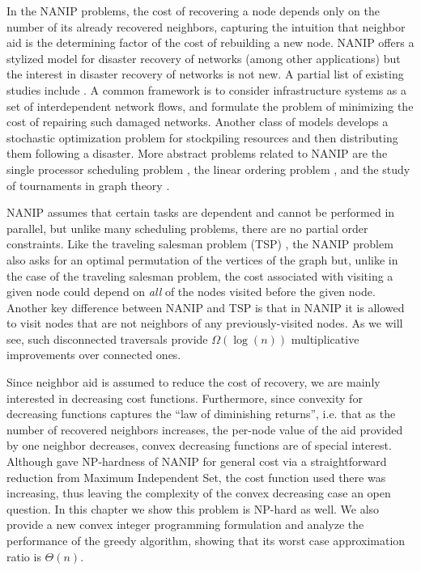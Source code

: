 In the NANIP problems, the cost of recovering a node depends only on the
number of its already recovered neighbors, capturing the intuition that
neighbor aid is the determining factor of the cost of rebuilding a new node.
NANIP offers a stylized model for disaster recovery of networks (among other
applications) but the interest in disaster recovery of networks is not new.  A
partial list of existing studies include
\cite{Guha99,nurre2010restoring,Lee07,Adibi94,Bertoli02,coffrin2011strategic}.
A common framework is to consider infrastructure systems as a set of
interdependent network flows, and formulate the problem of minimizing the cost
of repairing such damaged networks.  Another class of models
\cite{Hentenryck10} develops a stochastic optimization problem for stockpiling
resources and then distributing them following a disaster.  More abstract
problems related to NANIP are the single processor scheduling problem
\cite{Karp61}, the linear ordering problem \cite{Mitchell96}, and the study of
tournaments in graph theory \cite{West01}.  

NANIP assumes that certain tasks are dependent and cannot be performed in
parallel, but unlike many scheduling problems, there are no partial order
constraints. Like the traveling salesman problem (TSP)
\cite{schrijver2005history}, the NANIP problem also asks for an optimal
permutation of the vertices of the graph but, unlike in the case of the
traveling salesman problem, the cost associated with visiting a given node
could depend on \emph{all} of the nodes visited before the given node. Another
key difference between NANIP and TSP is that in NANIP it is allowed to visit
nodes that are not neighbors of any previously-visited nodes. As we will see,
such disconnected traversals provide $\Omega(\log(n))$ multiplicative
improvements over connected ones.

Since neighbor aid is assumed to reduce the cost of recovery, we are mainly
interested in decreasing cost functions. Furthermore, since convexity for
decreasing functions captures the ``law of diminishing returns'', i.e. that as
the number of recovered neighbors increases, the per-node value of the aid
provided by one neighbor decreases, convex decreasing functions are of special
interest. Although \cite{Gutfraind14}  gave NP-hardness of NANIP for general
cost via a straightforward reduction from Maximum Independent Set, the cost
function used there was increasing, thus leaving the complexity of the convex
decreasing case an open question.  In this chapter we show this problem is
NP-hard as well.  We also provide a new convex integer programming formulation
and analyze the performance of the greedy algorithm, showing that its worst
case approximation ratio is $\Theta(n)$.


